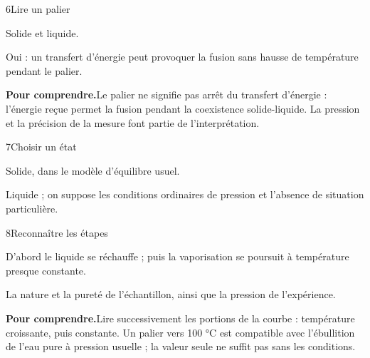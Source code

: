 \par\noindent\begin{minipage}{\linewidth}
\begin{corrige}{6}{Lire un palier}
\begin{questions}
\item Solide et liquide.
\item Oui : un transfert d’énergie peut provoquer la fusion sans hausse de température pendant le palier.
\end{questions}
\par\smallskip\noindent\textbf{Pour comprendre.}\enspace Le palier ne signifie pas arrêt du transfert d’énergie : l’énergie reçue permet la fusion pendant la coexistence solide-liquide. La pression et la précision de la mesure font partie de l’interprétation.\par
{}
\end{corrige}
\end{minipage}
\par\noindent\begin{minipage}{\linewidth}
\begin{corrige}{7}{Choisir un état}
\begin{questions}
\item Solide, dans le modèle d’équilibre usuel.
\item Liquide ; on suppose les conditions ordinaires de pression et l’absence de situation particulière.
\end{questions}
\end{corrige}
\end{minipage}
\par\noindent\begin{minipage}{\linewidth}
\begin{corrige}{8}{Reconnaître les étapes}
\begin{questions}
\item D’abord le liquide se réchauffe ; puis la vaporisation se poursuit à température presque constante.
\item La nature et la pureté de l’échantillon, ainsi que la pression de l’expérience.
\end{questions}
\par\smallskip\noindent\textbf{Pour comprendre.}\enspace Lire successivement les portions de la courbe : température croissante, puis constante. Un palier vers 100 °C est compatible avec l’ébullition de l’eau pure à pression usuelle ; la valeur seule ne suffit pas sans les conditions.\par
{}
\end{corrige}
\end{minipage}

